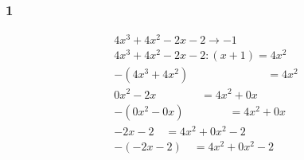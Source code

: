\documentclass[11pt,a4paper]{article}
\begin{document}
\subsubsection*{1}

\begin{eqnarray}
4x^3 + 4x^2 - 2x - 2 \rightarrow -1\\
4x^3 + 4x^2 - 2x - 2 : (x + 1) = 4x^2\\
-(4x^3 + 4x^2)\qquad\qquad\qquad\quad = 4x^2\\
0x^2 - 2x\qquad\qquad  = 4x^2 + 0x\\
-(0x^2 - 0x)\qquad\qquad = 4x^2 + 0x\\
-2x - 2 \quad = 4x^2 + 0x^2 - 2\\
-(-2x - 2) \quad = 4x^2 + 0x^2 - 2
\end{eqnarray}
\end{document}
